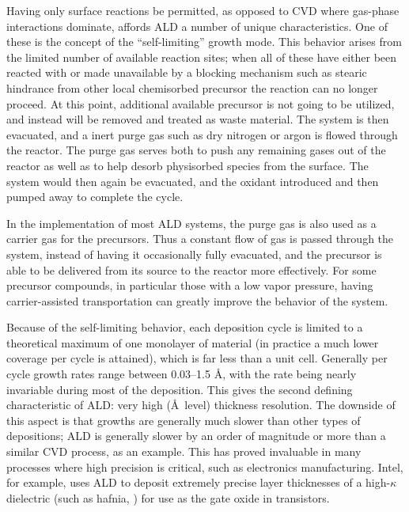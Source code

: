 Having only surface reactions be permitted, as opposed to CVD where gas-phase interactions dominate, affords ALD a number of unique characteristics. One of these is the concept of the ``self-limiting'' growth mode.\cite{ALD-Handbook} This behavior arises from the limited number of available reaction sites; when all of these have either been reacted with or made unavailable by a blocking mechanism such as stearic hindrance from other local chemisorbed precursor the reaction can no longer proceed. At this point, additional available precursor is not going to be utilized, and instead will be removed and treated as waste material. The system is then evacuated, and a inert purge gas such as dry nitrogen or argon is flowed through the reactor. The purge gas serves both to push any remaining gases out of the reactor as well as to help desorb physisorbed species from the surface.  The system would then again be evacuated, and the oxidant introduced and then pumped away to complete the cycle.\cite{ALD-Handbook} 

In the implementation of most ALD systems, the purge gas is also used as a carrier gas for the precursors. Thus a constant flow of gas is passed through the system, instead of having it occasionally fully evacuated, and the precursor is able to be delivered from its source to the reactor more effectively. For some precursor compounds, in particular those with a low vapor pressure, having carrier-assisted transportation can greatly improve the behavior of the system.\cite{ALD-Handbook} 

Because of the self-limiting behavior, each deposition cycle is limited to a theoretical maximum of one monolayer of material (in practice a much lower coverage per cycle is attained), which is far less than a unit cell.\cite{ALD-Handbook} Generally per cycle growth rates range between 0.03--1.5 \AA{}, with the rate being nearly invariable during most of the deposition. This gives the second defining characteristic of ALD: very high (\AA\ level) thickness resolution. The downside of this aspect is that growths are generally much slower than other types of depositions; ALD is generally slower by an order of magnitude or more than a similar CVD process, as an example. This has proved invaluable in many processes where high precision is critical, such as electronics manufacturing. Intel, for example, uses ALD to deposit extremely precise layer thicknesses of a high-$\kappa$ dielectric (such as hafnia, ) for use as the gate oxide in transistors.\cite{toriumi_application_2008,chen_atomic_2007}

